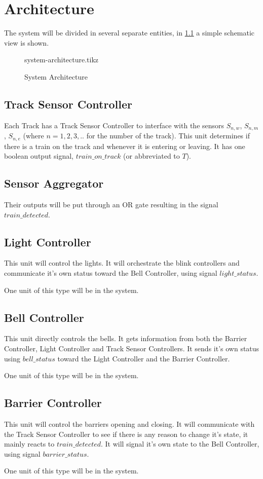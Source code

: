 \documentclass[final]{report}
\begin{document}
\chapter{Architecture}
\label{ch:architecture}
The system will be divided in several separate entities, in \cref{fig:system-architecture} a simple schematic view is shown.

\begin{figure}[H]
	\centering
	{system-architecture.tikz}
	\caption{System Architecture}
	\label{fig:system-architecture}
\end{figure}

\section{Track Sensor Controller}\label{sec:architecture-sensor-controller}
Each Track has a Track Sensor Controller to interface with the sensors $S_{n,w}$, $S_{n,m}$, $S_{n,e}$ (where $n = 1,2,3,..$ for the number of the track).
This unit determines if there is a train on the track and whenever it is entering or leaving.
It has one boolean output signal, $train\_on\_track$ (or abbreviated to $T$).


\section{Sensor Aggregator}\label{sec:architecture-sensor-aggregator}
Their outputs will be put through an OR gate resulting in the signal $train\_detected$.

\section{Light Controller}\label{sec:architecture-light-controller}
This unit will control the lights.
It will orchestrate the blink controllers and communicate it's own status toward the Bell Controller, using signal $light\_status$.

One unit of this type will be in the system.

\section{Bell Controller}\label{sec:architecture-bell-controller}
This unit directly controls the bells.
It gets information from both the Barrier Controller, Light Controller and Track Sensor Controllers.
It sends it's own status using $bell\_status$ toward the Light Controller and the Barrier Controller.

One unit of this type will be in the system.

\section{Barrier Controller}\label{sec:architecture-barrier-controller}
This unit will control the barriers opening and closing.
It will communicate with the Track Sensor Controller to see if there is any reason to change it's state, it mainly reacts to $train\_detected$.
It will signal it's own state to the Bell Controller, using signal $barrier\_status$.

One unit of this type will be in the system.
\end{document}
